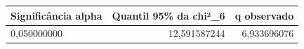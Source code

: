 \begin{tabular}{lrr}
\toprule
Significância alpha & Quantil 95\% da chi²\_6 & q observado \\
\midrule
0,050000000 & 12,591587244 & 6,933696076 \\
\bottomrule
\end{tabular}
